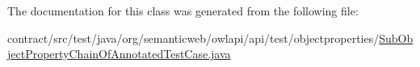 The documentation for this class was generated from the following file\-:\begin{DoxyCompactItemize}
\item 
contract/src/test/java/org/semanticweb/owlapi/api/test/objectproperties/\hyperlink{_sub_object_property_chain_of_annotated_test_case_8java}{Sub\-Object\-Property\-Chain\-Of\-Annotated\-Test\-Case.\-java}\end{DoxyCompactItemize}
